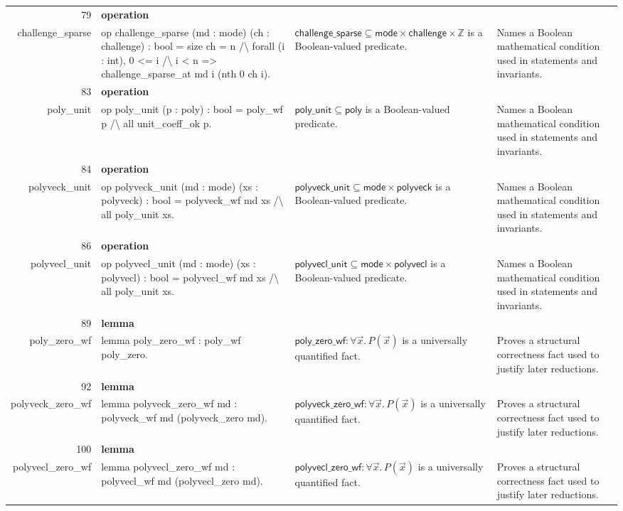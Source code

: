 \documentclass[10pt]{article}
\newcommand{\ec}[1]{\begingroup\ttfamily\scriptsize #1\endgroup}
\begin{document}
\begin{longtable}{r L{0.17\textwidth} L{0.26\textwidth} L{0.27\textwidth} L{0.20\textwidth}}
79 & \textbf{operation}\\\ec{challenge\_sparse} & \ec{op challenge\_sparse (md : mode) (ch : challenge) : bool = size ch = n /\textbackslash{} forall (i : int), 0 <= i /\textbackslash{} i < n => challenge\_sparse\_at md i (nth 0 ch i).} & \(\mathsf{challenge\_sparse} \subseteq \mathsf{mode} \times \mathsf{challenge} \times \mathbb{Z}\) is a Boolean-valued predicate. & Names a Boolean mathematical condition used in statements and invariants. \\
83 & \textbf{operation}\\\ec{poly\_unit} & \ec{op poly\_unit (p : poly) : bool = poly\_wf p /\textbackslash{} all unit\_coeff\_ok p.} & \(\mathsf{poly\_unit} \subseteq \mathsf{poly}\) is a Boolean-valued predicate. & Names a Boolean mathematical condition used in statements and invariants. \\
84 & \textbf{operation}\\\ec{polyveck\_unit} & \ec{op polyveck\_unit (md : mode) (xs : polyveck) : bool = polyveck\_wf md xs /\textbackslash{} all poly\_unit xs.} & \(\mathsf{polyveck\_unit} \subseteq \mathsf{mode} \times \mathsf{polyveck}\) is a Boolean-valued predicate. & Names a Boolean mathematical condition used in statements and invariants. \\
86 & \textbf{operation}\\\ec{polyvecl\_unit} & \ec{op polyvecl\_unit (md : mode) (xs : polyvecl) : bool = polyvecl\_wf md xs /\textbackslash{} all poly\_unit xs.} & \(\mathsf{polyvecl\_unit} \subseteq \mathsf{mode} \times \mathsf{polyvecl}\) is a Boolean-valued predicate. & Names a Boolean mathematical condition used in statements and invariants. \\
89 & \textbf{lemma}\\\ec{poly\_zero\_wf} & \ec{lemma poly\_zero\_wf : poly\_wf poly\_zero.} & \(\mathsf{poly\_zero\_wf} : \forall \vec{x}.\, P(\vec{x})\) is a universally quantified fact. & Proves a structural correctness fact used to justify later reductions. \\
92 & \textbf{lemma}\\\ec{polyveck\_zero\_wf} & \ec{lemma polyveck\_zero\_wf md : polyveck\_wf md (polyveck\_zero md).} & \(\mathsf{polyveck\_zero\_wf} : \forall \vec{x}.\, P(\vec{x})\) is a universally quantified fact. & Proves a structural correctness fact used to justify later reductions. \\
100 & \textbf{lemma}\\\ec{polyvecl\_zero\_wf} & \ec{lemma polyvecl\_zero\_wf md : polyvecl\_wf md (polyvecl\_zero md).} & \(\mathsf{polyvecl\_zero\_wf} : \forall \vec{x}.\, P(\vec{x})\) is a universally quantified fact. & Proves a structural correctness fact used to justify later reductions. \\

\end{longtable}
\end{document}
